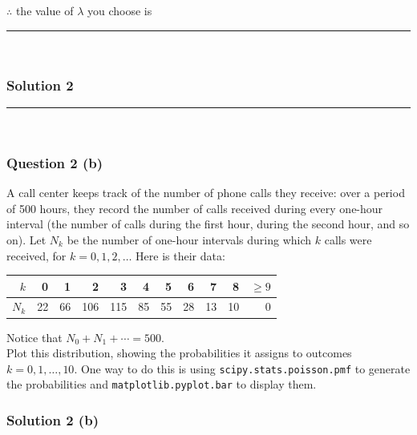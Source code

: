 \documentclass{article}
\begin{document}
\subsubsection*{\normalfont}{$\therefore$ the value of $\lambda$ you choose is}\\

\noindent\rule{\textwidth}{0.4pt}\\

\newpage

\subsubsection*{Solution 2}
\noindent\rule{\textwidth}{0.4pt}\\
\subsubsection*{Question 2 (b)}
\begin{flushleft}
    A call center keeps track of the number of phone calls they receive: over a period of 500 hours, they record the number of calls received during every one-hour interval (the number of calls during the first hour, during the second hour, and so on). Let $N_{k}$ be the number of one-hour intervals during which $k$ calls were received, for $k=0,1,2, \ldots$ Here is their data:
\end{flushleft}
\begin{table}[h]
\centering
\begin{tabular}{r|rrrrrrrrrr}
$k$ & 0 & 1 & 2 & 3 & 4 & 5 & 6 & 7 & 8 & $\geq 9$ \\
\midrule
$N_{k}$ & 22 & 66 & 106 & 115 & 85 & 55 & 28 & 13 & 10 & 0 \\
\end{tabular}
\end{table}

\begin{flushleft}
    Notice that $N_{0}+N_{1}+\cdots=500$.\\
    Plot this distribution, showing the probabilities it assigns to outcomes $k=0,1, \ldots, 10$. One way to do this is using \texttt{scipy.stats.poisson.pmf} to generate the probabilities and \texttt{matplotlib.pyplot.bar} to display them.
\end{flushleft}
\subsubsection*{Solution 2 (b)}
\end{document}
